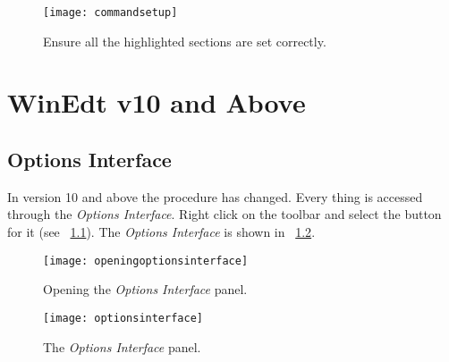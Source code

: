 \documentclass{lebook}
\begin{document}
    \begin{figure}
        \centering
        \texttt{[image: commandsetup]}
        \caption{Ensure all the highlighted sections are set correctly.}
        \label{fig:commandsetup}
    \end{figure}


    \chapter{WinEdt v10 and Above}
    \section{Options Interface}
In version 10 and above the procedure has changed.  Every thing is accessed through the \textit{Options Interface}.  Right click on the toolbar and select the button for it (see \figurename~\ref{fig:openingoptionsinterface}).  The \textit{Options Interface} is shown in \figurename~\ref{fig:optionsinterface}.
    \begin{figure}
		\centering
		\texttt{[image: openingoptionsinterface]}
		\caption{Opening the \textit{Options Interface} panel.}
		\label{fig:openingoptionsinterface}
    \end{figure}

    \begin{figure}
		\centering
		\texttt{[image: optionsinterface]}
		\caption{The \textit{Options Interface} panel.}
		\label{fig:optionsinterface}
    \end{figure}
\end{document}

